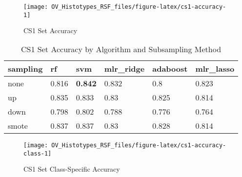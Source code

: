 \documentclass[
]{report}
\begin{document}
\begin{figure}[H]

{\centering \texttt{[image: OV\_Histotypes\_RSF\_files/figure-latex/cs1-accuracy-1]} 

}

\caption{CS1 Set Accuracy}\label{fig:cs1-accuracy}
\end{figure}

\begin{table}

\caption{\label{tab:cs1-accuracy-table}CS1 Set Accuracy by Algorithm and Subsampling Method}
\centering
\begin{tabular}[t]{l|l|l|l|l|l}
\hline
sampling & rf & svm & mlr\_ridge & adaboost & mlr\_lasso\\
\hline
none & 0.816 & \textbf{0.842} & 0.832 & 0.8 & 0.823\\
\hline
up & 0.835 & 0.833 & 0.83 & 0.825 & 0.814\\
\hline
down & 0.798 & 0.802 & 0.788 & 0.776 & 0.764\\
\hline
smote & 0.837 & 0.837 & 0.83 & 0.828 & 0.814\\
\hline
\end{tabular}
\end{table}

\begin{figure}[H]

{\centering \texttt{[image: OV\_Histotypes\_RSF\_files/figure-latex/cs1-accuracy-class-1]} 

}

\caption{CS1 Set Class-Specific Accuracy}\label{fig:cs1-accuracy-class}
\end{figure}
\end{document}

